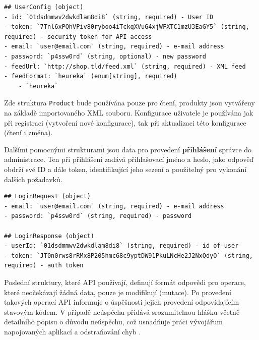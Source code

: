 \documentclass[FM,DP]{tulthesis}
\newenvironment{code}
    {\filbreak\captionsetup{type=listing}}{\filbreak}
\begin{document}
\begin{code}
\captionsetup{singlelinecheck=false,justification=raggedright}
\label{code:api-user}
\begin{verbatim}
## UserConfig (object)
- id: `01dsdmmwv2dwkdlam8di8` (string, required) - User ID
- token: `7Tnl6xPQhVPiv80ryboo4iTckqXVuG4xjWFXTC1mzU3EaGY5` (string, required) - security token for API access
- email: `user@email.com` (string, required) - e-mail address
- password: `p4ssw0rd` (string, optional) - new password
- feedUrl: `http://shop.tld/feed.xml` (string, required) - XML feed
- feedFormat: `heureka` (enum[string], required)
    - `heureka`
\end{verbatim}
\end{code}

Zde struktura \Verb|Product| bude používána pouze pro čtení, produkty jsou vytvářeny
na základě importovaného XML souboru. Konfigurace uživatele je používána jak při
registraci (vytvoření nové konfigurace), tak při aktualizaci této konfigurace (čtení
i změna).

Dalšími pomocnými strukturami jsou data pro provedení \textbf{přihlášení} správce 
do administrace. Ten při přihlášení zadává přihlašovací jméno a heslo, jako odpověď 
obdrží své ID a dále token, identifikující jeho sezení a použitelný pro vykonání 
dalších požadavků.

\begin{code}
\captionsetup{singlelinecheck=false,justification=raggedright}
\label{code:api-request}
\begin{verbatim}
## LoginRequest (object)
- email: `user@email.com` (string, required) - e-mail address
- password: `p4ssw0rd` (string, required) - password

## LoginResponse (object)
- userId: `01dsdmmwv2dwkdlam8di8` (string, required) - id of user
- token: `JT0n0rws8rRMx8P205hmc68c9yptDW91PkuLNcHe2J2NxQdyO` (string, required) - auth token
\end{verbatim}
\end{code}

Poslední struktury, které API používají, definují formát odpovědi pro operace, které
neočekávají žádná data, pouze je modifikují (mutace). Po provedení takových operací
API informuje o úspěšnosti jejich provedení odpovídajícím stavovým kódem. V případě 
neúspěchu přidává srozumitelnou hlášku včetně detailního popisu o důvodu neúspěchu, 
což usnadňuje práci vývojářum napojovaných aplikací a odstraňování chyb \cite[strana~42]{api}.
\end{document}
